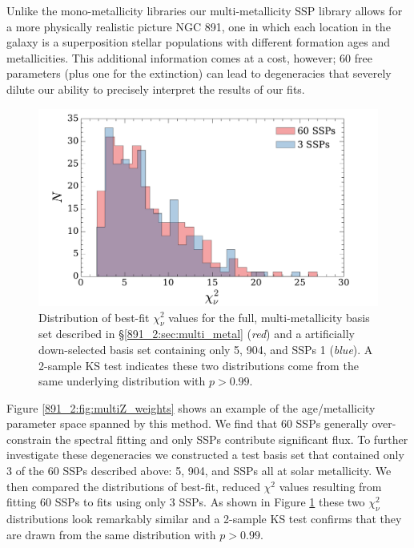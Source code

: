 Unlike the mono-metallicity libraries our multi-metallicity SSP
library allows for a more physically realistic picture NGC 891, one in
which each location in the galaxy is a superposition stellar
populations with different formation ages and metallicities. This
additional information comes at a cost, however; 60 free parameters
(plus one for the extinction) can lead to degeneracies that severely
dilute our ability to precisely interpret the results of our fits.

\begin{figure}
  \centering
  \includegraphics[width=\columnwidth]{891_2/figs/allz_chihist.pdf}
  \caption[$\chi_{\nu}^2$ distribution for 61 and 4 parameter
    fits]{\fixspacing\label{891_2:fig:3SSP_chi}Distribution of
    best-fit $\chi^2_\nu$ values for the full, multi-metallicity basis
    set described in \S\ref{891_2:sec:multi_metal} (\emph{red}) and a
    artificially down-selected basis set containing only 5, 904, and
     SSPs 1 \Zsol (\emph{blue}). A 2-sample KS test
    indicates these two distributions come from the same underlying
    distribution with $p > 0.99$.}
\end{figure}

Figure \ref{891_2:fig:multiZ_weights} shows an example of the
age/metallicity parameter space spanned by this method. We find that
60 SSPs generally over-constrain the spectral fitting and only 
SSPs contribute significant flux. To further investigate these
degeneracies we constructed a test basis set that contained only 3 of
the 60 SSPs described above: 5, 904, and  SSPs all at
solar metallicity. We then compared the distributions of best-fit,
reduced $\chi^2$ values resulting from fitting 60 SSPs to fits using
only 3 SSPs. As shown in Figure \ref{891_2:fig:3SSP_chi} these two
$\chi^2_\nu$ distributions look remarkably similar and a 2-sample KS
test confirms that they are drawn from the same distribution with $p >
0.99$. 

